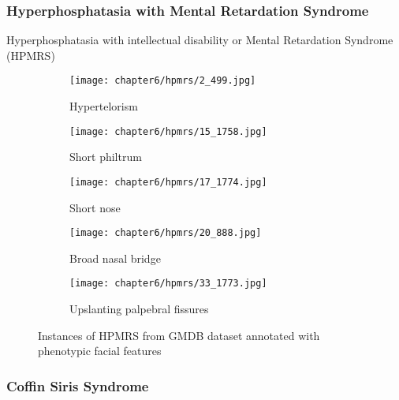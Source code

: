 \documentclass[../report.tex]{subfiles}
\begin{document}
	\subsubsection{Hyperphosphatasia with Mental Retardation Syndrome}
	Hyperphosphatasia with intellectual disability or Mental Retardation Syndrome (HPMRS) 
	 \begin{figure}[H]\label{fig_hpmrs}
	 	\centering
	 	\begin{subfigure}[t]{0.17\textwidth}
	 		\centering
	 		\texttt{[image: chapter6/hpmrs/2\_499.jpg]}
	 		\caption{Hypertelorism}
	 	\end{subfigure}
	 	\begin{subfigure}[t]{0.17\textwidth}
	 		\centering
	 		\texttt{[image: chapter6/hpmrs/15\_1758.jpg]}
	 		\caption{Short philtrum}
	 	\end{subfigure}	
	 	\begin{subfigure}[t]{0.17\textwidth}
	 		\centering
	 		\texttt{[image: chapter6/hpmrs/17\_1774.jpg]}
			\caption{Short nose}
	 	\end{subfigure}	
	 	\begin{subfigure}[t]{0.17\textwidth}
	 		\centering
	 		\texttt{[image: chapter6/hpmrs/20\_888.jpg]}
	 		\caption{Broad nasal bridge}
	 	\end{subfigure}	
	 	\begin{subfigure}[t]{0.17\textwidth}
	 		\centering
	 		\texttt{[image: chapter6/hpmrs/33\_1773.jpg]}
	 		\caption{Upslanting palpebral fissures}
	 	\end{subfigure}	
	 	\caption[Instances of HPMRS from GMDB dataset]{Instances of HPMRS from GMDB dataset annotated with phenotypic facial features}
	 \end{figure}
	 
	 	\subsubsection{Coffin Siris Syndrome}
	 
\end{document}
